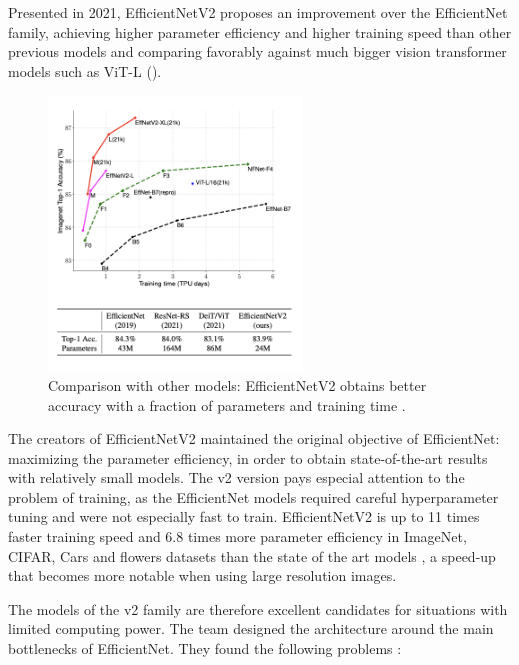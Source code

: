 Presented in 2021, EfficientNetV2 proposes an improvement over the EfficientNet family, achieving higher parameter efficiency and higher training speed than other previous models and comparing favorably against much bigger vision transformer models such as ViT-L (). 
\begin{figure}[tbp]
    \centering
    \includegraphics[width=0.6\textwidth]{figures/chapter5/efficient/graficaV2.png}
    \caption{Comparison with other models: EfficientNetV2 obtains better accuracy with a fraction of parameters and training time \cite{tan2021efficientnetv2}.}
    \label{fig:comparison}
\end{figure}

The creators of EfficientNetV2 maintained the original objective of EfficientNet: maximizing the parameter efficiency, in order to obtain state-of-the-art results with relatively small models. The v2 version pays especial attention to the problem of training, as the EfficientNet models required careful hyperparameter tuning and were not especially fast to train. EfficientNetV2 is up to 11 times faster training speed and 6.8 times more parameter efficiency in ImageNet, CIFAR, Cars and flowers datasets than the state of the art models \cite{tan2021efficientnetv2}, a speed-up that becomes more notable when using large resolution images.

The models of the v2 family are therefore excellent candidates for situations with limited computing power. The team designed the architecture around the main bottlenecks of EfficientNet. They found the following problems \cite{tan2021efficientnetv2}:

